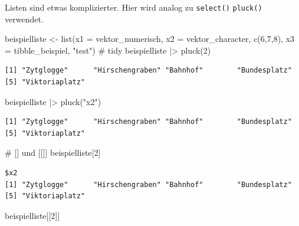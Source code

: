\documentclass[
  letterpaper,
  DIV=11,
  numbers=noendperiod]{scrreprt}
\newenvironment{Shaded}{\begin{snugshade}}{\end{snugshade}}
\newcommand{\AttributeTok}[1]{\textcolor[rgb]{0.40,0.45,0.13}{#1}}
\newcommand{\CommentTok}[1]{\textcolor[rgb]{0.37,0.37,0.37}{#1}}
\newcommand{\DecValTok}[1]{\textcolor[rgb]{0.68,0.00,0.00}{#1}}
\newcommand{\FunctionTok}[1]{\textcolor[rgb]{0.28,0.35,0.67}{#1}}
\newcommand{\NormalTok}[1]{\textcolor[rgb]{0.00,0.23,0.31}{#1}}
\newcommand{\OtherTok}[1]{\textcolor[rgb]{0.00,0.23,0.31}{#1}}
\newcommand{\SpecialCharTok}[1]{\textcolor[rgb]{0.37,0.37,0.37}{#1}}
\newcommand{\StringTok}[1]{\textcolor[rgb]{0.13,0.47,0.30}{#1}}
\begin{document}
Listen sind etwas komplizierter. Hier wird analog zu \texttt{select()}
\texttt{pluck()} verwendet.

\begin{Shaded}
\begin{Highlighting}[]
\NormalTok{beispielliste }\OtherTok{\textless{}{-}} \FunctionTok{list}\NormalTok{(}\AttributeTok{x1 =}\NormalTok{ vektor\_numerisch, }\AttributeTok{x2 =}\NormalTok{ vektor\_character, }\FunctionTok{c}\NormalTok{(}\DecValTok{6}\NormalTok{,}\DecValTok{7}\NormalTok{,}\DecValTok{8}\NormalTok{), }\AttributeTok{x3 =}\NormalTok{ tibble\_beispiel, }\StringTok{"test"}\NormalTok{)}
\CommentTok{\# tidy}
\NormalTok{beispielliste }\SpecialCharTok{|\textgreater{}} \FunctionTok{pluck}\NormalTok{(}\DecValTok{2}\NormalTok{)}
\end{Highlighting}
\end{Shaded}

\begin{verbatim}
[1] "Zytglogge"      "Hirschengraben" "Bahnhof"        "Bundesplatz"   
[5] "Viktoriaplatz" 
\end{verbatim}

\begin{Shaded}
\begin{Highlighting}[]
\NormalTok{beispielliste }\SpecialCharTok{|\textgreater{}} \FunctionTok{pluck}\NormalTok{(}\StringTok{"x2"}\NormalTok{)}
\end{Highlighting}
\end{Shaded}

\begin{verbatim}
[1] "Zytglogge"      "Hirschengraben" "Bahnhof"        "Bundesplatz"   
[5] "Viktoriaplatz" 
\end{verbatim}

\begin{Shaded}
\begin{Highlighting}[]
\CommentTok{\# [] und [[]]}
\NormalTok{beispielliste[}\DecValTok{2}\NormalTok{]}
\end{Highlighting}
\end{Shaded}

\begin{verbatim}
$x2
[1] "Zytglogge"      "Hirschengraben" "Bahnhof"        "Bundesplatz"   
[5] "Viktoriaplatz" 
\end{verbatim}

\begin{Shaded}
\begin{Highlighting}[]
\NormalTok{beispielliste[[}\DecValTok{2}\NormalTok{]]}
\end{Highlighting}
\end{Shaded}
\end{document}
